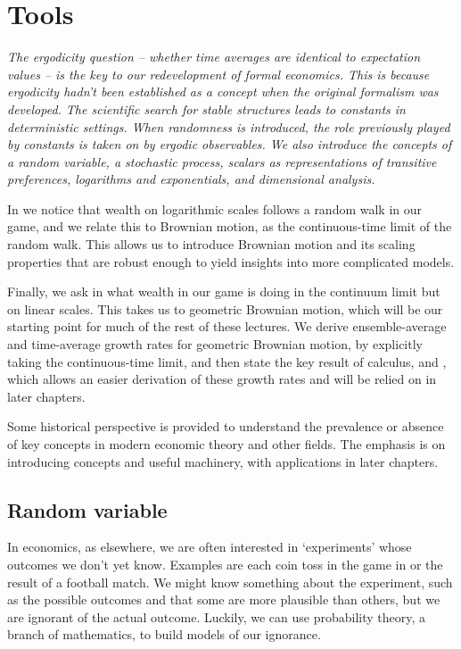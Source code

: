 \chapter{Tools}

{\it
The ergodicity question  -- whether time averages are identical to expectation values -- is the key to our redevelopment of formal economics. This is because ergodicity hadn't been established as a concept when the original formalism was developed. The scientific search for stable structures leads to constants in deterministic settings. When randomness is introduced, the role previously played by constants is taken on by ergodic observables. We also introduce the concepts of a random variable, a stochastic process, scalars as representations of transitive preferences, logarithms and exponentials, and dimensional analysis.

In  we notice that wealth on logarithmic scales follows a random walk in our game, and we relate this to Brownian motion, as the continuous-time limit of the random walk. This allows us to introduce Brownian motion and its scaling properties that are robust enough to yield insights into more complicated models.

Finally, we ask in  what wealth in our game is doing in the continuum limit but on linear scales. This takes us to geometric Brownian motion, which will be our starting point for much of the rest of these lectures. We derive ensemble-average and time-average growth rates for geometric Brownian motion, by explicitly taking the continuous-time limit, and then state the key result of \Ito calculus,  and , which allows an easier derivation of these growth rates and will be relied on in later chapters.

Some historical perspective is provided to understand the prevalence or absence of key concepts in modern economic theory and other fields. The emphasis is on introducing concepts and useful machinery, with applications in later chapters.
}
\newpage

\section{Random variable}
In economics, as elsewhere, we are often interested in `experiments' whose outcomes we don't yet know. Examples are each coin toss in the game in  or the result of a football match. We might know something about the experiment, such as the possible outcomes and that some are more plausible than others, but we are ignorant of the actual outcome. Luckily, we can use probability theory, a branch of mathematics, to build models of our ignorance.

